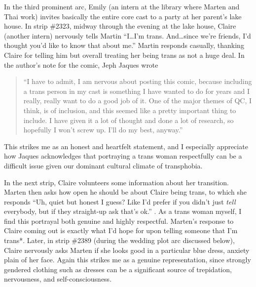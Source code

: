\documentclass[man,12pt]{apa6}
\begin{document}
In the third prominent arc, Emily (an intern at the library where Marten and Thai work) invites basically the entire core cast to a party at her parent's lake house. In strip \#2323, midway through the evening at the lake house, Claire (another intern) nervously tells Martin ``I\ldots I'm trans. And\ldots since we're friends, I'd thought you'd like to know that about me.'' Martin responds casually, thanking Claire for telling him but overall treating her being trans as not a huge deal. In the author's note for the comic, Jeph Jaques wrote 
\begin{quote}
``I have to admit, I am nervous about posting this comic, because including a trans person in my cast is something I have wanted to do for years and I really, really want to do a good job of it. One of the major themes of QC, I think, is of inclusion, and this seemed like a pretty important thing to include. I have given it a lot of thought and done a lot of research, so hopefully I won't screw up. I'll do my best, anyway.'' \cite{qc}
\end{quote}
This strikes me as an honest and heartfelt statement, and I especially appreciate how Jaques acknowledges that portraying a trans woman respectfully can be a difficult issue given our dominant cultural climate of transphobia. 

In the next strip, Claire volunteers some information about her transition. Marten then asks how open he should be about Claire being trans, to which she responds ``Uh, quiet but honest I guess? Like I'd prefer if you didn't just \emph{tell} everybody, but if they straight-up ask that's ok.'' \cite{qc}. As a trans woman myself, I find this portrayal both genuine and highly respectful. Marten's response to Claire coming out is exactly what I'd hope for upon telling someone that I'm trans*. Later, in strip \#2389 (during the wedding plot arc discussed below), Claire nervously asks Marten if she looks good in a particular blue dress, anxiety plain of her face. Again this strikes me as a genuine representation, since strongly gendered clothing such as dresses can be a significant source of trepidation, nervousness, and self-consciousness.
\end{document}
